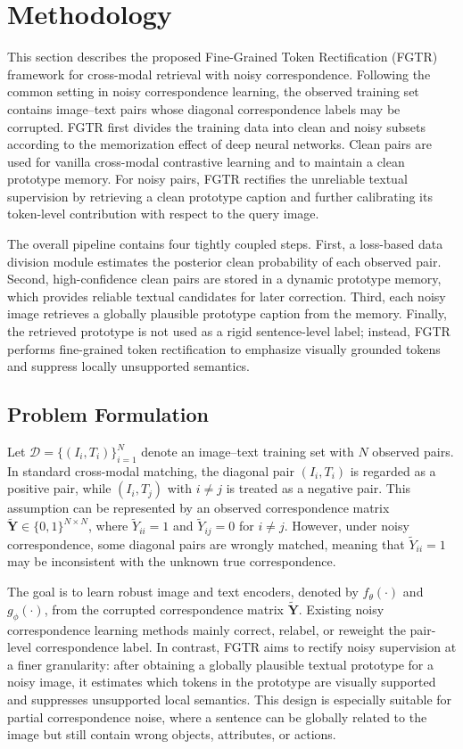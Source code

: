 \section{Methodology}
This section describes the proposed Fine-Grained Token Rectification (FGTR) framework for cross-modal retrieval with noisy correspondence. Following the common setting in noisy correspondence learning, the observed training set contains image--text pairs whose diagonal correspondence labels may be corrupted. FGTR first divides the training data into clean and noisy subsets according to the memorization effect of deep neural networks. Clean pairs are used for vanilla cross-modal contrastive learning and to maintain a clean prototype memory. For noisy pairs, FGTR rectifies the unreliable textual supervision by retrieving a clean prototype caption and further calibrating its token-level contribution with respect to the query image.

The overall pipeline contains four tightly coupled steps. First, a loss-based data division module estimates the posterior clean probability of each observed pair. Second, high-confidence clean pairs are stored in a dynamic prototype memory, which provides reliable textual candidates for later correction. Third, each noisy image retrieves a globally plausible prototype caption from the memory. Finally, the retrieved prototype is not used as a rigid sentence-level label; instead, FGTR performs fine-grained token rectification to emphasize visually grounded tokens and suppress locally unsupported semantics.

\subsection{Problem Formulation}
Let $\mathcal{D}=\{(I_i,T_i)\}_{i=1}^{N}$ denote an image--text training set with $N$ observed pairs. In standard cross-modal matching, the diagonal pair $(I_i,T_i)$ is regarded as a positive pair, while $(I_i,T_j)$ with $i\neq j$ is treated as a negative pair. This assumption can be represented by an observed correspondence matrix $\widetilde{\mathbf{Y}}\in\{0,1\}^{N\times N}$, where $\widetilde{Y}_{ii}=1$ and $\widetilde{Y}_{ij}=0$ for $i\neq j$. However, under noisy correspondence, some diagonal pairs are wrongly matched, meaning that $\widetilde{Y}_{ii}=1$ may be inconsistent with the unknown true correspondence.

The goal is to learn robust image and text encoders, denoted by $f_{\theta}(\cdot)$ and $g_{\phi}(\cdot)$, from the corrupted correspondence matrix $\widetilde{\mathbf{Y}}$. Existing noisy correspondence learning methods mainly correct, relabel, or reweight the pair-level correspondence label. In contrast, FGTR aims to rectify noisy supervision at a finer granularity: after obtaining a globally plausible textual prototype for a noisy image, it estimates which tokens in the prototype are visually supported and suppresses unsupported local semantics. This design is especially suitable for partial correspondence noise, where a sentence can be globally related to the image but still contain wrong objects, attributes, or actions.

